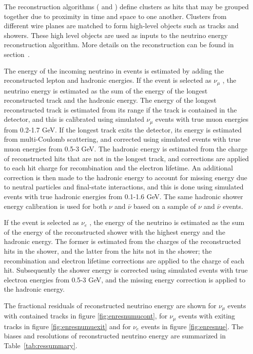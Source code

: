 The reconstruction algorithms ( and ) define clusters as hits that may be grouped together due to proximity in time and space to one another. Clusters from different wire planes are matched to form high-level objects such as tracks and showers. These high level objects are used as inputs to the neutrino energy reconstruction algorithm. More details on the reconstruction can be found in section~\cite{sec:tools-fdreco}.


The energy of the incoming neutrino in  events is estimated by adding the reconstructed lepton and hadronic energies. 
If the event is selected as $\nu_{\mu}$ , the neutrino energy is estimated as the sum of the energy of the longest reconstructed track and the hadronic energy. The energy of the longest reconstructed track is estimated from its range if the track is contained in the detector, and this is calibrated using simulated $\nu_{\mu}$  events with true muon energies from 0.2-1.7 GeV. If the longest track exits the detector, its energy is estimated from multi-Coulomb scattering, and corrected using simulated events with true muon energies from 0.5-3 GeV. The hadronic energy is estimated from the charge of reconstructed hits that are not in the longest track, and corrections are applied to each hit charge for recombination and the electron lifetime. An additional correction is then made to the hadronic energy to account for missing energy due to neutral particles and final-state interactions, and this is done using simulated events with true hadronic energies from 0.1-1.6 GeV. The same hadronic shower energy calibration is used for both $\nu$ and $\bar{\nu}$ based on a sample of $\nu$ and $\bar{\nu}$ events.

If the event is selected as $\nu_{e}$ , the energy of the 
neutrino is estimated as the sum of the energy of the reconstructed shower with the highest energy and the hadronic energy. The former is estimated from the charges of the reconstructed hits in the shower, and the latter from the hits not in the shower; the recombination and electron lifetime corrections are applied to the charge of each hit. Subsequently the shower energy is corrected using simulated events with true electron energies from 0.5-3 GeV, and the missing energy correction is applied to the hadronic energy.

The fractional residuals of reconstructed neutrino energy are shown for $\nu_{\mu}$  events with contained tracks in figure \ref{fig:enresnumucont}, for $\nu_{\mu}$  events with exiting tracks in figure \ref{fig:enresnumuexit} and for $\nu_{e}$  events in figure \ref{fig:enresnue}. The biases and resolutions of reconstructed neutrino energy are summarized in Table~\ref{tab:ressummary}.

